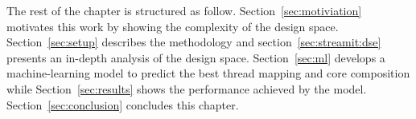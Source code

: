 The rest of the chapter is structured as follow.
Section~\ref{sec:motiviation} motivates this work by showing the complexity of the design space.
Section~\ref{sec:setup} describes the methodology and section~\ref{sec:streamit:dse} presents an in-depth analysis of the design space.
Section~\ref{sec:ml} develops a machine-learning model to predict the best thread mapping and core composition while Section~\ref{sec:results} shows the performance achieved by the model.
Section~\ref{sec:conclusion} concludes this chapter.
